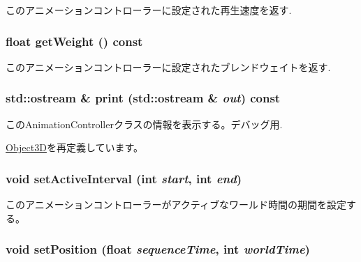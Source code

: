 このアニメーションコントローラーに設定された再生速度を返す. \hypertarget{classm3g_1_1AnimationController_a17d38dafd3d75c59f0609f037fbe5ae}{
\subsubsection[{getWeight}]{\setlength{\rightskip}{0pt plus 5cm}float getWeight () const}}
\label{classm3g_1_1AnimationController_a17d38dafd3d75c59f0609f037fbe5ae}


このアニメーションコントローラーに設定されたブレンドウェイトを返す. \hypertarget{classm3g_1_1AnimationController_6fea17fa1532df3794f8cb39cb4f911f}{
\subsubsection[{print}]{\setlength{\rightskip}{0pt plus 5cm}std::ostream \& print (std::ostream \& {\em out}) const}}
\label{classm3g_1_1AnimationController_6fea17fa1532df3794f8cb39cb4f911f}


このAnimationControllerクラスの情報を表示する。デバッグ用. 

\hyperlink{classm3g_1_1Object3D_6fea17fa1532df3794f8cb39cb4f911f}{Object3D}を再定義しています。\hypertarget{classm3g_1_1AnimationController_a4cba877288d7a188477e0a756fd2f58}{
\subsubsection[{setActiveInterval}]{\setlength{\rightskip}{0pt plus 5cm}void setActiveInterval (int {\em start}, \/  int {\em end})}}
\label{classm3g_1_1AnimationController_a4cba877288d7a188477e0a756fd2f58}


このアニメーションコントローラーがアクティブなワールド時間の期間を設定する。 \hypertarget{classm3g_1_1AnimationController_a20a5553bd449b21bad74666055626f0}{
\subsubsection[{setPosition}]{\setlength{\rightskip}{0pt plus 5cm}void setPosition (float {\em sequenceTime}, \/  int {\em worldTime})}}
\label{classm3g_1_1AnimationController_a20a5553bd449b21bad74666055626f0}


